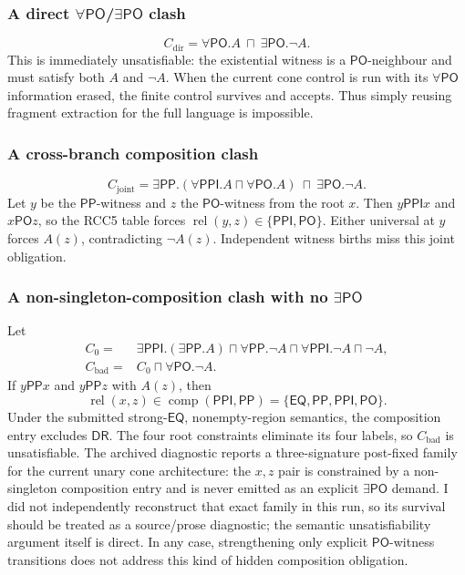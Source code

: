 \documentclass[11pt]{article}
\newcommand{\PO}{\ensuremath{\mathsf{PO}}}
\newcommand{\PP}{\ensuremath{\mathsf{PP}}}
\newcommand{\PPI}{\ensuremath{\mathsf{PPI}}}
\newcommand{\DR}{\ensuremath{\mathsf{DR}}}
\newcommand{\EQ}{\ensuremath{\mathsf{EQ}}}
\begin{document}
\subsubsection{A direct \texorpdfstring{\(\forall\PO\)/\(\exists\PO\)}{forall-PO/exists-PO} clash}

\[
C_{\mathrm{dir}}=\forall\PO.A\ \sqcap\ \exists\PO.\neg A.
\]
This is immediately unsatisfiable: the existential witness is a \PO-neighbour
and must satisfy both \(A\) and \(\neg A\).  When the current cone control is
run with its \(\forall\PO\) information erased, the finite control survives and
accepts.  Thus simply reusing fragment extraction for the full language is
impossible.

\subsubsection{A cross-branch composition clash}

\[
C_{\mathrm{joint}}=
\exists\PP.(\forall\PPI.A\sqcap\forall\PO.A)
\ \sqcap\ \exists\PO.\neg A.
\]
Let \(y\) be the \PP-witness and \(z\) the \PO-witness from the root \(x\).
Then \(y\PPI x\) and \(x\PO z\), so the RCC5 table forces
\(\operatorname{rel}(y,z)\in\{\PPI,\PO\}\).  Either universal at \(y\)
forces \(A(z)\), contradicting \(\neg A(z)\).  Independent witness births miss
this joint obligation.

\subsubsection{A non-singleton-composition clash with no \texorpdfstring{\(\exists\PO\)}{exists-PO}}

Let
\[
\begin{aligned}
C_0={}&\exists\PPI.(\exists\PP.A)
\sqcap\forall\PP.\neg A
\sqcap\forall\PPI.\neg A
\sqcap\neg A,\\
C_{\mathrm{bad}}={}&C_0\sqcap\forall\PO.\neg A.
\end{aligned}
\]
If \(y\PP x\) and \(y\PP z\) with \(A(z)\), then
\[
\operatorname{rel}(x,z)\in
\operatorname{comp}(\PPI,\PP)=\{\EQ,\PP,\PPI,\PO\}.
\]
Under the submitted strong-\EQ{}, nonempty-region semantics, the composition
entry excludes \DR{}.  The four root constraints eliminate its four labels, so
\(C_{\mathrm{bad}}\) is unsatisfiable.  The archived diagnostic reports a
three-signature post-fixed family for the current unary cone architecture: the
\(x,z\) pair is constrained by a non-singleton composition entry and is never
emitted as an explicit \(\exists\PO\) demand.  I did not independently
reconstruct that exact family in this run, so its survival should be treated as
a source/prose diagnostic; the semantic unsatisfiability argument itself is
direct.  In any case, strengthening only explicit \PO-witness transitions does
not address this kind of hidden composition obligation.
\end{document}
